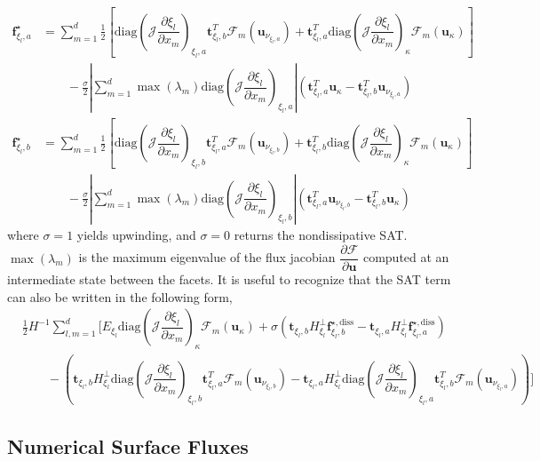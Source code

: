 \documentclass[12pt,a4paper]{article}
\newcommand{\pder}[2][]{\dfrac{\partial #1}{\partial #2}} %
\newcommand{\fn}[1]{\mathcal{#1}} %
\newcommand{\fnb}[1]{\bm{\mathcal{#1}}} %
\begin{document}
\begin{align*}
\bm{f}^\star_{\xi_l,a} &=  \sum_{m=1}^d \frac{1}{2} \left[ \text{diag} \left( \fn{J} \pder[\xi_l]{x_m} \right)_{\xi_l,a} \bm{t}^T_{\xi_l,b} \fnb{F}_m \left( \bm{u}_{\nu_{\xi_l,a}} \right) + \bm{t}^T_{\xi_l,a} \text{diag} \left( \fn{J} \pder[\xi_l]{x_m} \right)_{\kappa}  \fnb{F}_m \left( \bm{u}_{\kappa} \right) \right] \\
&\qquad - \frac{\sigma}{2} \left\vert \sum_{m=1}^d \max (\lambda_m) \text{diag} \left( \fn{J} \pder[\xi_l]{x_m} \right)_{\xi_l,a} \right\vert \left( \bm{t}^T_{\xi_l,a} \bm{u}_\kappa - \bm{t}^T_{\xi_l,b} \bm{u}_{\nu_{\xi_l,a}}  \right) \\
\bm{f}^\star_{\xi_l,b} &=  \sum_{m=1}^d \frac{1}{2} \left[ \text{diag} \left( \fn{J} \pder[\xi_l]{x_m} \right)_{\xi_l,b} \bm{t}^T_{\xi_l,a} \fnb{F}_m \left( \bm{u}_{\nu_{\xi_l,b}} \right)+  \bm{t}^T_{\xi_l,b} \text{diag} \left( \fn{J} \pder[\xi_l]{x_m} \right)_{\kappa}  \fnb{F}_m \left( \bm{u}_{\kappa} \right) \right] \\
&\qquad - \frac{\sigma}{2} \left\vert \sum_{m=1}^d \max (\lambda_m) \text{diag} \left( \fn{J} \pder[\xi_l]{x_m} \right)_{\xi_l,b} \right\vert \left( \bm{t}^T_{\xi_l,a} \bm{u}_{\nu_{\xi_l,b}} - \bm{t}^T_{\xi_l,b} \bm{u}_\kappa   \right)
\end{align*}
where $\sigma = 1$ yields upwinding, and  $\sigma = 0$ returns the nondissipative SAT. $\max (\lambda_m)$ is the maximum eigenvalue of the flux jacobian $\pder[\fnb{F}]{\bm{u}}$ computed at an intermediate state between the facets. It is useful to recognize that the SAT term can also be written in the following form, 
\begin{align*}
&\frac{1}{2} H^{-1} \sum_{l,m = 1}^d \Bigg[ E_{\xi_l} \text{diag} \left( \fn{J} \pder[\xi_l]{x_m} \right)_\kappa \fnb{F}_m ( \bm{u}_\kappa) + \sigma \left( \bm{t}_{\xi_l,b} H^{\bot}_{\xi_l} \bm{f}^{\star , \text{diss}}_{\xi_l,b}  - \bm{t}_{\xi_l,a} H^{\bot}_{\xi_l} \bm{f}^{\star , \text{diss}}_{\xi_l,a} \right)  \\
&\qquad - \left( \bm{t}_{\xi_l,b} H^{\bot}_{\xi_l} \text{diag} \left( \fn{J} \pder[\xi_l]{x_m} \right)_{\xi_l,b} \bm{t}^T_{\xi_l,a}  \fnb{F}_m ( \bm{u}_{\nu_{\xi_l,b}} ) - \bm{t}_{\xi_l,a} H^{\bot}_{\xi_l} \text{diag} \left( \fn{J} \pder[\xi_l]{x_m} \right)_{\xi_l,a} \bm{t}_{\xi_l,b}^T  \fnb{F}_m ( \bm{u}_{\nu_{\xi_l,a}} ) \right) \Bigg]
\end{align*} 

\subsection{Numerical Surface Fluxes}
\end{document}
